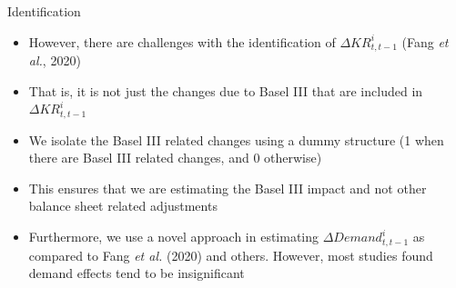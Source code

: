 \documentclass[
  14,
  ignorenonframetext,
  aspectratio=141,
]{beamer}
\providecommand{\tightlist}{%
  \setlength{\itemsep}{0pt}\setlength{\parskip}{0pt}}
\begin{document}
\begin{frame}{Identification}
\protect\hypertarget{identification}{}
\begin{itemize}
\tightlist
\item
  However, there are challenges with the identification of
  \(\Delta KR^i_{t, t-1}\) (Fang \emph{et al.}, 2020)
\item
  That is, it is not just the changes due to Basel III that are included
  in \(\Delta KR^i_{t, t-1}\)
\item
  We isolate the Basel III related changes using a dummy structure (1
  when there are Basel III related changes, and 0 otherwise)
\item
  This ensures that we are estimating the Basel III impact and not other
  balance sheet related adjustments
\item
  Furthermore, we use a novel approach in estimating
  \(\Delta Demand^i_{t, t-1}\) as compared to Fang \emph{et al.} (2020)
  and others. However, most studies found demand effects tend to be
  insignificant
\end{itemize}
\end{frame}
\end{document}
